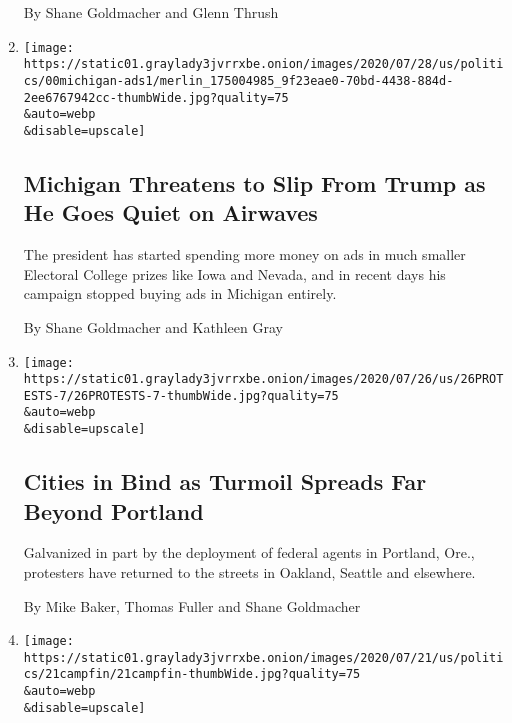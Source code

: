 \begin{enumerate}
  By Shane Goldmacher and Glenn Thrush
\item
  \href{/2020/07/29/us/politics/michigan-trump-biden-2020.html}{}

  \texttt{[image: https://static01.graylady3jvrrxbe.onion/images/2020/07/28/us/politics/00michigan-ads1/merlin\_175004985\_9f23eae0-70bd-4438-884d-2ee6767942cc-thumbWide.jpg?quality=75\\\&auto=webp\\\&disable=upscale]}

  \hypertarget{michigan-threatens-to-slip-from-trump-as-he-goes-quiet-on-airwaves}{%
  \subsection{Michigan Threatens to Slip From Trump as He Goes Quiet on
  Airwaves}\label{michigan-threatens-to-slip-from-trump-as-he-goes-quiet-on-airwaves}}

  The president has started spending more money on ads in much smaller
  Electoral College prizes like Iowa and Nevada, and in recent days his
  campaign stopped buying ads in Michigan entirely.

  By Shane Goldmacher and Kathleen Gray
\item
  \href{/2020/07/26/us/protests-portland-seattle-trump.html}{}

  \texttt{[image: https://static01.graylady3jvrrxbe.onion/images/2020/07/26/us/26PROTESTS-7/26PROTESTS-7-thumbWide.jpg?quality=75\\\&auto=webp\\\&disable=upscale]}

  \hypertarget{cities-in-bind-as-turmoil-spreads-far-beyond-portland}{%
  \subsection{Cities in Bind as Turmoil Spreads Far Beyond
  Portland}\label{cities-in-bind-as-turmoil-spreads-far-beyond-portland}}

  Galvanized in part by the deployment of federal agents in Portland,
  Ore., protesters have returned to the streets in Oakland, Seattle and
  elsewhere.

  By Mike Baker, Thomas Fuller and Shane Goldmacher
\item
  \href{/2020/07/21/us/politics/trump-tulsa-rally-cost.html}{}

  \texttt{[image: https://static01.graylady3jvrrxbe.onion/images/2020/07/21/us/politics/21campfin/21campfin-thumbWide.jpg?quality=75\\\&auto=webp\\\&disable=upscale]}

  \hypertarget{trumps-tulsa-rally-drew-sparse-crowd-but-it-cost-22-million}{%
}
\end{enumerate}
